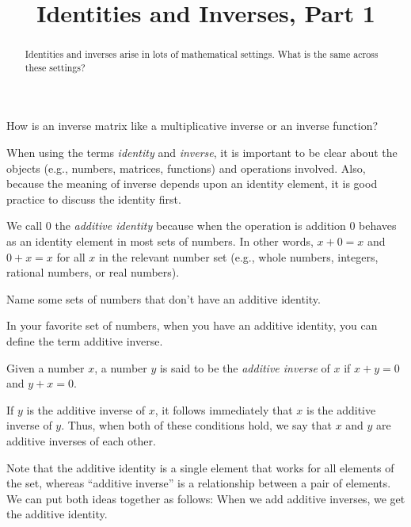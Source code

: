 \documentclass[space,handout,nooutcomes]{ximera}
\title{Identities and Inverses, Part 1}
\begin{document}
\begin{abstract}
Identities and inverses arise in lots of mathematical
settings.  What is the same across these settings?  
\end{abstract}
\maketitle


How is an inverse matrix like a multiplicative inverse or an inverse function?  

When using the terms \emph{identity} and \emph{inverse}, it is
important to be clear about the objects (e.g., numbers, matrices,
functions) and operations involved.  Also, because the meaning of
inverse depends upon an identity element, it is good practice to
discuss the identity first.

\begin{definition}
We call $0$ the \emph{additive identity} because when the operation is addition 
$0$ behaves as an identity element in most sets of numbers.  
In other words, $x+0=x$ and $0+x=x$ for all $x$ in the relevant number
set (e.g., whole numbers, integers, rational numbers, or real
numbers).
\end{definition}

\begin{question}
Name some sets of numbers that don't have an additive identity.
\end{question}

In your favorite set of numbers, when you have an additive identity,
you can define the term additive inverse.  

\begin{definition}
Given a number $x$, a number $y$ is said to be the \emph{additive
  inverse} of $x$ if $x+y=0$ and $y+x=0$.  
\end{definition}

If $y$ is the additive inverse of $x$, it follows immediately that
$x$ is the additive inverse of $y$.  Thus, when both of these
conditions hold, we say that $x$ and $y$ are additive inverses of each
other.

Note that the additive identity is a single element that works for
all elements of the set, whereas ``additive inverse'' is a
relationship between a pair of elements.  We can put both ideas
together as follows: When we add additive inverses, we get the
additive identity.
\end{document}
